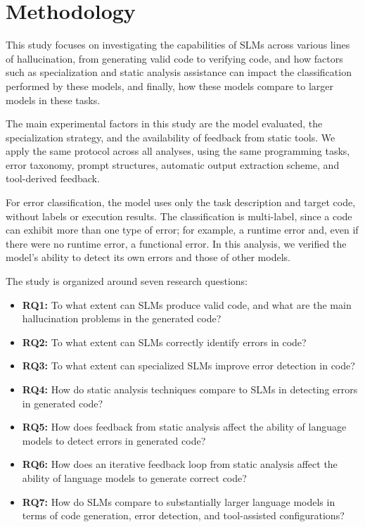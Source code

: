 \section{Methodology}

This study focuses on investigating the capabilities of SLMs across various lines of hallucination, from generating valid code to verifying code, and how factors such as specialization and static analysis assistance can impact the classification performed by these models, and finally, how these models compare to larger models in these tasks.

The main experimental factors in this study are the model evaluated, the specialization strategy, and the availability of feedback from static tools. We apply the same protocol across all analyses, using the same programming tasks, error taxonomy, prompt structures, automatic output extraction scheme, and tool-derived feedback.

For error classification, the model uses only the task description and target code, without labels or execution results. The classification is multi-label, since a code can exhibit more than one type of error; for example, a runtime error and, even if there were no runtime error, a functional error. In this analysis, we verified the model's ability to detect its own errors and those of other models.

The study is organized around seven research questions:

\begin{itemize}

\item \textbf{RQ1:} To what extent can SLMs produce valid code, and what are the main hallucination problems in the generated code?
\item \textbf{RQ2:} To what extent can SLMs correctly identify errors in code?
\item \textbf{RQ3:} To what extent can specialized SLMs improve error detection in code?
\item \textbf{RQ4:} How do static analysis techniques compare to SLMs in detecting errors in generated code?
\item \textbf{RQ5:} How does feedback from static analysis affect the ability of language models to detect errors in generated code?
\item \textbf{RQ6:} How does an iterative feedback loop from static analysis affect the ability of language models to generate correct code?
\item \textbf{RQ7:} How do SLMs compare to substantially larger language models in terms of code generation, error detection, and tool-assisted configurations?
\end{itemize}

